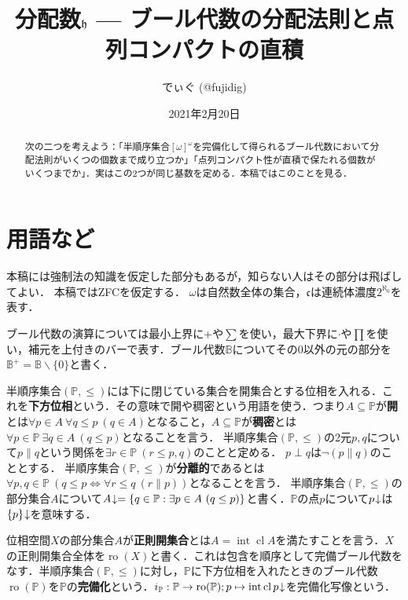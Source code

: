 \documentclass[uplatex,dvipdfmx]{jsarticle}
\title{分配数$\mathfrak{h}$ — ブール代数の分配法則と点列コンパクトの直積}
\author{でぃぐ (@fujidig)}
\date{2021年2月20日}
\renewcommand{\P}{\mathbb{P}}
\newcommand{\B}{\mathbb{B}}
\newcommand{\cl}{\operatorname{cl}}
\newcommand{\intr}{\operatorname{int}}
\newcommand{\ro}{\operatorname{ro}}
\newcommand{\frakc}{\mathfrak{c}}
\newcommand{\down}{\hspace{-0.2em}\downarrow}
\renewcommand\subset{\subseteq}
\renewcommand{\setminus}{\smallsetminus}
\theoremstyle{definition}
\theoremstyle{named}
\begin{document}
\maketitle

\begin{abstract}
次の二つを考えよう：「半順序集合$[\omega]^\omega$を完備化して得られるブール代数において分配法則がいくつの個数まで成り立つか」「点列コンパクト性が直積で保たれる個数がいくつまでか」．実はこの2つが同じ基数を定める．本稿ではこのことを見る．
\end{abstract}

\tableofcontents

\vspace{0.3cm}

\section{用語など}

本稿には強制法の知識を仮定した部分もあるが，知らない人はその部分は飛ばしてよい．
本稿ではZFCを仮定する．
$\omega$は自然数全体の集合，$\frakc$は連続体濃度$2^{\aleph_0}$を表す．

ブール代数の演算については最小上界に$+$や$\sum$を使い，最大下界に$\cdot$や$\prod$を使い，補元を上付きのバーで表す．ブール代数$\B$についてその$0$以外の元の部分を$\B^+=\B\setminus\{0\}$と書く．

半順序集合$(\P, \le)$には下に閉じている集合を開集合とする位相を入れる．これを{\bfseries 下方位相}という．その意味で開や稠密という用語を使う．つまり$A \subset \P$が{\bfseries 開}とは$\forall p \in A \ \forall q \le p\ (q \in A)$となること，$A \subset \P$が{\bfseries 稠密}とは$\forall p \in \P\ \exists q \in A\ (q \le p)$となることを言う．
半順序集合$(\P, \le)$の2元$p, q$について$p \parallel q$という関係を$\exists r \in \P\ (r \le p, q)$のことと定める．
$p \perp q$は$\neg (p \parallel q)$のこととする．
半順序集合$(\P, \le)$が{\bfseries 分離的}であるとは$\forall p, q \in \P\ (q \le p \Leftrightarrow \forall r \le q\ (r \parallel p))$となることを言う．
半順序集合$(\P, \le)$の部分集合$A$について$A \down = \{ q \in \P : \exists p \in A\ (q \le p) \}$と書く．$\P$の点$p$について$p \down$は$\{p\} \down$を意味する．

位相空間$X$の部分集合$A$が{\bfseries 正則開集合}とは$A = \intr \cl A$を満たすことを言う．$X$の正則開集合全体を$\ro(X)$と書く．これは包含を順序として完備ブール代数をなす．半順序集合$(\P, \le)$に対し，$\P$に下方位相を入れたときのブール代数$\ro(\P)$を$\P$の{\bfseries 完備化}という．$i_\P: \P \to \ro(\P); p \mapsto \intr \cl p \down$を完備化写像という．
\end{document}
